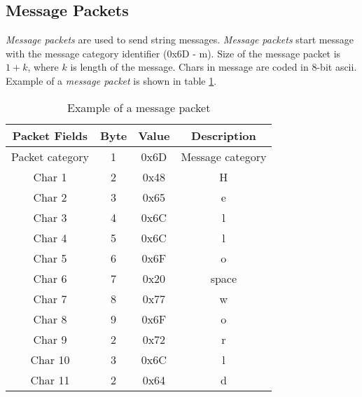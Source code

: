 \subsection{Message Packets}
\label{sec:messagesPackets}
\textit{Message packets} are used to send string messages. \textit{Message packets} start message with the message category identifier  (0x6D - m). Size of the message packet is $1+k$, where $k$ is length of the message. Chars in message are coded in 8-bit ascii. Example of a \textit{message packet} is shown in table \ref{tab:messagePacket}.

\begin{table}[H]
\begin{center}
\begin{tabular}{c c c c}
\toprule
\rowcolor[HTML]{FFFC9E} 
\textbf{Packet Fields} & \textbf{Byte} & \textbf{Value} & \textbf{Description}    \\ \midrule
Packet category        & 1             & 0x6D           & Message category        \\ [1ex]
Char 1                 & 2             & 0x48          & H                        \\ [1ex]
Char 2                 & 3             & 0x65          & e                        \\ [1ex]
Char 3                 & 4             & 0x6C          & l                        \\ [1ex]
Char 4                 & 5             & 0x6C          & l                        \\ [1ex]
Char 5                 & 6             & 0x6F          & o                        \\ [1ex]
Char 6                 & 7             & 0x20          & space                    \\ [1ex]
Char 7                 & 8             & 0x77          & w                        \\ [1ex]
Char 8                 & 9             & 0x6F          & o                        \\ [1ex]
Char 9                 & 2             & 0x72          & r                        \\ [1ex]
Char 10                & 3             & 0x6C          & l                        \\ [1ex]
Char 11                & 2             & 0x64          & d                        \\ [1ex]

 \bottomrule
\end{tabular}
\end{center}
\caption{Example of a message packet}
\label{tab:messagePacket}
\end{table}




